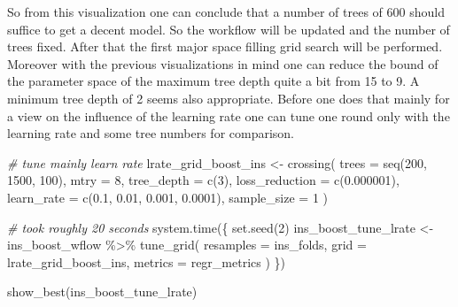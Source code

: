 \documentclass[
]{book}
\newenvironment{Shaded}{\begin{snugshade}}{\end{snugshade}}
\newcommand{\AttributeTok}[1]{\textcolor[rgb]{0.77,0.63,0.00}{#1}}
\newcommand{\CommentTok}[1]{\textcolor[rgb]{0.56,0.35,0.01}{\textit{#1}}}
\newcommand{\DecValTok}[1]{\textcolor[rgb]{0.00,0.00,0.81}{#1}}
\newcommand{\FloatTok}[1]{\textcolor[rgb]{0.00,0.00,0.81}{#1}}
\newcommand{\FunctionTok}[1]{\textcolor[rgb]{0.00,0.00,0.00}{#1}}
\newcommand{\NormalTok}[1]{#1}
\newcommand{\OtherTok}[1]{\textcolor[rgb]{0.56,0.35,0.01}{#1}}
\newcommand{\SpecialCharTok}[1]{\textcolor[rgb]{0.00,0.00,0.00}{#1}}
\begin{document}
So from this visualization one can conclude that a number of trees of 600 should suffice to get a decent model. So the workflow will be updated and the number of trees fixed. After that the first major space filling grid search will be performed. Moreover with the previous visualizations in mind one can reduce the bound of the parameter space of the maximum tree depth quite a bit from 15 to 9. A minimum tree depth of 2 seems also appropriate.
Before one does that mainly for a view on the influence of the learning rate one can tune one round only with the learning rate and some tree numbers for comparison.

\begin{Shaded}
\begin{Highlighting}[]
\CommentTok{\# tune mainly learn rate}
\NormalTok{lrate\_grid\_boost\_ins }\OtherTok{\textless{}{-}} \FunctionTok{crossing}\NormalTok{(}
  \AttributeTok{trees =} \FunctionTok{seq}\NormalTok{(}\DecValTok{200}\NormalTok{, }\DecValTok{1500}\NormalTok{, }\DecValTok{100}\NormalTok{),}
  \AttributeTok{mtry =} \DecValTok{8}\NormalTok{,}
  \AttributeTok{tree\_depth =} \FunctionTok{c}\NormalTok{(}\DecValTok{3}\NormalTok{),}
  \AttributeTok{loss\_reduction =} \FunctionTok{c}\NormalTok{(}\FloatTok{0.000001}\NormalTok{),}
  \AttributeTok{learn\_rate =} \FunctionTok{c}\NormalTok{(}\FloatTok{0.1}\NormalTok{, }\FloatTok{0.01}\NormalTok{, }\FloatTok{0.001}\NormalTok{, }\FloatTok{0.0001}\NormalTok{),}
  \AttributeTok{sample\_size =} \DecValTok{1}
\NormalTok{)}
\end{Highlighting}
\end{Shaded}

\begin{Shaded}
\begin{Highlighting}[]
\CommentTok{\# took roughly 20 seconds}
\FunctionTok{system.time}\NormalTok{(\{}
  \FunctionTok{set.seed}\NormalTok{(}\DecValTok{2}\NormalTok{)}
\NormalTok{  ins\_boost\_tune\_lrate }\OtherTok{\textless{}{-}}\NormalTok{ ins\_boost\_wflow }\SpecialCharTok{\%\textgreater{}\%}
    \FunctionTok{tune\_grid}\NormalTok{(}
      \AttributeTok{resamples =}\NormalTok{  ins\_folds,}
      \AttributeTok{grid =}\NormalTok{ lrate\_grid\_boost\_ins,}
      \AttributeTok{metrics =}\NormalTok{ regr\_metrics}
\NormalTok{    )}
\NormalTok{\})}


\FunctionTok{show\_best}\NormalTok{(ins\_boost\_tune\_lrate)}
\end{Highlighting}
\end{Shaded}
\end{document}
